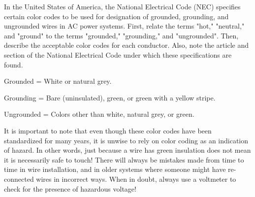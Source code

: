 

In the United States of America, the National Electrical Code (NEC) specifies certain color codes to be used for designation of grounded, grounding, and ungrounded wires in AC power systems.  First, relate the terms "hot," "neutral," and "ground" to the terms "grounded," "grounding," and "ungrounded".  Then, describe the acceptable color codes for each conductor.  Also, note the article and section of the National Electrical Code under which these specifications are found.







Grounded = White or natural grey.

Grounding = Bare (uninsulated), green, or green with a yellow stripe.

Ungrounded = Colors other than white, natural grey, or green.







It is important to note that even though these color codes have been standardized for many years, it is unwise to rely on color coding as an indication of hazard.  In other words, just because a wire has green insulation does not mean it is necessarily safe to touch!  There will always be mistakes made from time to time in wire installation, and in older systems where someone might have re-connected wires in incorrect ways.  When in doubt, always use a voltmeter to check for the presence of hazardous voltage!




